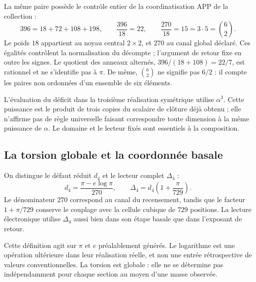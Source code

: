 La même paire possède le contrôle entier de la coordinatisation APP de la collection :
\begin{equation}
 396=18+72+108+198,
 \qquad \frac{396}{18}=22,
 \qquad \frac{270}{18}=15=3\cdot5=\binom62.
 \label{eq:el-censo}
\end{equation}
Le poids \(18\) appartient au noyau central \(2\times2\), et \(270\) au canal global déclaré. Ces égalités contrôlent la normalisation du décompte ; l'argument de retour fixe en outre les signes. Le quotient des anneaux alternés, \(396/(18+108)=22/7\), est rationnel et ne s'identifie pas à \(\pi\). De même, \(\binom62\) ne signifie pas \(6/2\) : il compte les paires non ordonnées d'un ensemble de six éléments.

L'évaluation du déficit dans la troisième réalisation symétrique utilise
\(\alpha^3\). Cette puissance est le produit de trois copies du scalaire
de clôture déjà obtenu ; elle n'affirme pas de règle universelle faisant
correspondre toute dimension à la même puissance de \(\alpha\).
Le domaine et le lecteur fixés sont essentiels à la composition.

\subsection{La torsion globale et la coordonnée basale}

\begin{definition}
On distingue le défaut réduit \(d_4\) et le lecteur complet
\(\Delta_4\) :
\begin{equation}
 d_4=\frac{\pi-e\log\pi}{270},\qquad
 \Delta_4=d_4\left(1+\frac{\pi}{729}\right).
 \label{eq:el-delta}
\end{equation}
Le dénominateur \(270\) correspond au canal du recensement, tandis que le facteur \(1+\pi/729\) conserve le couplage avec la cellule cubique de \(729\) positions. La lecture électronique utilise \(\Delta_4\) aussi bien dans son étape basale que dans l'exposant de retour.
\end{definition}

Cette définition agit sur \(\pi\) et \(e\) préalablement générés. Le
logarithme est une opération ultérieure dans leur réalisation réelle, et non une
entrée rétrospective de valeurs conventionnelles. La torsion est globale :
elle ne se détermine pas indépendamment pour chaque section au moyen d'une masse
observée.

